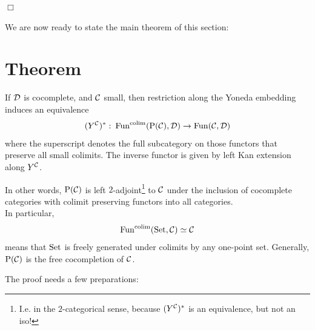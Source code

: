         \quad\hfill$\Box$

        We are now ready to state the main theorem of this section:
    \section{Theorem}\label{chI-42}
        If $\mathcal{D}$ is cocomplete, and $\mathcal{C}$ small, then restriction along the Yoneda embedding induces an equivalence
        \begin{equation*}
            (Y^{\mathcal{C}})^* \,\colon \operatorname{Fun}^{\operatorname*{colim}}(\mathrm{P}(\mathcal{C}), \mathcal{D}) \to \operatorname{Fun}(\mathcal{C}, \mathcal{D})
        \end{equation*}
        where the superscript denotes the full subcategory on those functors that preserve all small colimits. The inverse functor is given by left Kan extension along $Y^{\mathcal{C}}$.

        In other words, $\mathrm{P}(\mathcal{C})$ is left $2$-adjoint\footnote{I.e. in the $2$-categorical sense, because $(Y^{\mathcal{C}})^*$ is an equivalence, but not an iso!} to $\mathcal{C}$ under the inclusion of cocomplete categories with colimit preserving functors into all categories.\\
        In particular,
        \begin{equation*}
            \operatorname{Fun}^{\operatorname*{colim}}(\operatorname{Set}, \mathcal{C}) \simeq \mathcal{C}
        \end{equation*}
        means that $\operatorname{Set}$ is freely generated under colimits by any one-point set. Generally, $\mathrm{P}(\mathcal{C})$ is the free cocompletion of $\mathcal{C}$.
        \medskip

        The proof needs a few preparations:
